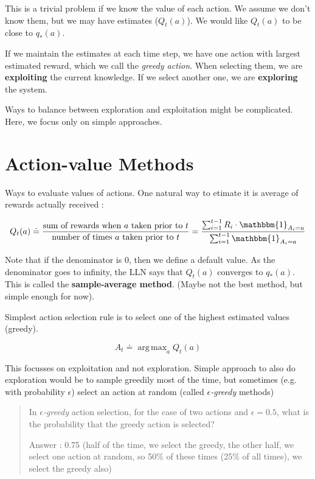 \documentclass{article}
\DeclareMathOperator*{\argmax}{arg\,max}
\begin{document}
This is a trivial problem if we know the value of each action. We assume we don't know them, but we may have estimates ($Q_t(a)$). We would like  $Q_t(a)$ to be close to $q_*(a)$.

If we maintain the estimates at each time step, we have one action with largest estimated reward, which we call the \textit{greedy action}. When selecting them, we are \textbf{exploiting} the current knowledge. If we select another one, we are \textbf{exploring} the system.

Ways to balance between exploration and exploitation might be complicated. Here, we focus only on simple approaches.

\section{Action-value Methods}

Ways to evaluate values of actions. One natural way to etimate it is average of rewards actually received :

\begin{equation}
Q_t(a) \doteq \frac{\text{sum of rewards when } a \text{ taken prior to } t}{\text{number of times } a \text { taken prior to } t} = \frac{\sum_{i=1}^{t-1} R_i \cdot \mathbbm{1}_{A_i=a}}{\sum_{i=1}^{t-1} \mathbbm{1}_{A_i = a}}
\end{equation}

Note that if the denominator is 0, then we define a default value. As the denominator goes to infinity, the LLN says that $Q_t(a)$ converges to $q_*(a)$. This is called the \textbf{sample-average method}. (Maybe not the best method, but simple enough for now).

Simplest action selection rule is to select one of the highest estimated values (greedy).

\begin{equation}
A_t \doteq \argmax_a Q_t(a)
\end{equation}

This focusses on exploitation and not exploration. Simple approach to also do exploration would be to sample greedily most of the time, but sometimes (e.g. with probability $\epsilon$) select an action at random (called $\epsilon$\textit{-greedy} methods)

\begin{quote}
	In $\epsilon$\textit{-greedy} action selection, for the case of two actions and $\epsilon=0.5$, what is the probability that the greedy action is selected?
	
	Answer : 0.75 (half of the time, we select the greedy, the other half, we select one action at random, so 50\% of these times (25\% of all times), we select the greedy also)
\end{quote}
\end{document}
